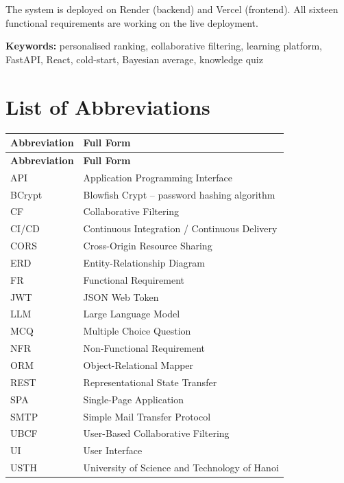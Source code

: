\documentclass[12pt,a4paper]{report}
\begin{document}
The system is deployed on Render (backend) and Vercel (frontend). All sixteen functional requirements are working on the live deployment.

\textbf{Keywords:} personalised ranking, collaborative filtering, learning platform, FastAPI, React, cold-start, Bayesian average, knowledge quiz

\newpage
\tableofcontents
\newpage
\listoffigures
\newpage
\listoftables
\newpage

\chapter*{List of Abbreviations}

\begin{longtable}{p{} p{}}
\toprule
\textbf{Abbreviation} & \textbf{Full Form} \\
\midrule
\endfirsthead
\toprule
\textbf{Abbreviation} & \textbf{Full Form} \\
\midrule
\endhead
API   & Application Programming Interface \\
BCrypt & Blowfish Crypt -- password hashing algorithm \\
CF    & Collaborative Filtering \\
CI/CD & Continuous Integration / Continuous Delivery \\
CORS  & Cross-Origin Resource Sharing \\
ERD   & Entity-Relationship Diagram \\
FR    & Functional Requirement \\
JWT   & JSON Web Token \\
LLM   & Large Language Model \\
MCQ   & Multiple Choice Question \\
NFR   & Non-Functional Requirement \\
ORM   & Object-Relational Mapper \\
REST  & Representational State Transfer \\
SPA   & Single-Page Application \\
SMTP  & Simple Mail Transfer Protocol \\
UBCF  & User-Based Collaborative Filtering \\
UI    & User Interface \\
USTH  & University of Science and Technology of Hanoi \\
\bottomrule
\end{longtable}
\end{document}
